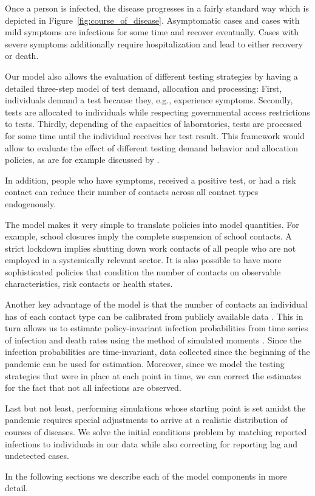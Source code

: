 Once a person is infected, the disease progresses in a fairly standard way which is
depicted in Figure~\ref{fig:course_of_disease}. Asymptomatic cases and cases with mild
symptoms are infectious for some time and recover eventually. Cases with severe symptoms
additionally require hospitalization and lead to either recovery or death.

Our model also allows the evaluation of different testing strategies by having a detailed
three-step model of test demand, allocation and processing:
First, individuals demand a test because they, e.g., experience symptoms.
Secondly, tests are allocated to individuals while respecting governmental access
restrictions to tests.
Thirdly, depending of the capacities of laboratories, tests are processed for some time
until the individual receives her test result.
This framework would allow to evaluate the effect of different testing demand behavior
and allocation policies, as are for example discussed by \cite{Troeger2020}.

In addition, people who have symptoms, received a positive test, or had a risk contact
can reduce their number of contacts across all contact types endogenously.

The model makes it very simple to translate policies into model quantities. For example,
school closures imply the complete suspension of school contacts. A strict lockdown
implies shutting down work contacts of all people who are not employed in a systemically
relevant sector. It is also possible to have more sophisticated policies that condition
the number of contacts on observable characteristics, risk contacts or health states.

Another key advantage of the model is that the number of contacts an individual has of
each contact type can be calibrated from publicly available data \citep{Mossong2008}.
This in turn allows us to estimate policy-invariant infection probabilities from time
series of infection and death rates using the method of simulated moments
\citep{McFadden1989}. Since the infection probabilities are time-invariant, data
collected since the beginning of the pandemic can be used for estimation. Moreover,
since we model the testing strategies that were in place at each point in time, we
can correct the estimates for the fact that not all infections are observed.

Last but not least, performing simulations whose starting point is set amidst the
pandemic requires special adjustments to arrive at a realistic distribution of courses
of diseases. We solve the initial conditions problem by matching reported infections to
individuals in our data while also correcting for reporting lag and undetected cases.

In the following sections we describe each of the model components in more detail.
